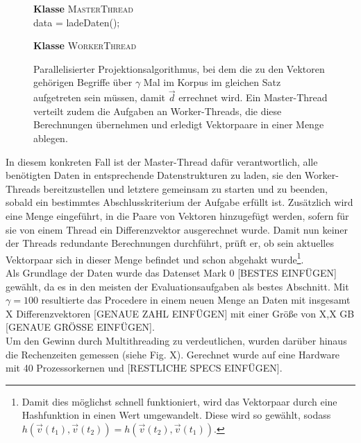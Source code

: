 \begin{figure}[h]
  \centering
  \begin{algorithm}[H]
    \BlankLine
    \textbf{Klasse} \textsc{MasterThread} \\
      data = ladeDaten();\\

    \BlankLine
    \textbf{Klasse} \textsc{WorkerThread} \\
  \end{algorithm}
  \caption[Parallelisierter Projektionsalgorithmus]{Parallelisierter Projektionsalgorithmus, bei dem die zu den Vektoren gehörigen
  Begriffe über $\gamma$ Mal im Korpus im gleichen Satz aufgetreten sein müssen, damit $\vec{d}$ errechnet wird. Ein Master-Thread
  verteilt zudem die Aufgaben an Worker-Threads, die diese Berechnungen übernehmen und erledigt Vektorpaare in einer Menge ablegen.}
\end{figure}

In diesem konkreten Fall ist der Master-Thread dafür verantwortlich, alle benötigten Daten in entsprechende Datenstrukturen
zu laden, sie den Worker-Threads bereitzustellen und letztere gemeinsam zu starten und zu beenden, sobald ein bestimmtes
Abschlusskriterium der Aufgabe erfüllt ist.
Zusätzlich wird eine Menge eingeführt, in die Paare von Vektoren hinzugefügt werden, sofern für sie von einem Thread
ein Differenzvektor ausgerechnet wurde. Damit nun keiner der Threads redundante Berechnungen durchführt, prüft er, ob sein
aktuelles Vektorpaar sich in dieser Menge befindet und schon abgehakt wurde\footnote{Damit dies möglichst schnell funktioniert,
wird das Vektorpaar durch eine Hashfunktion in einen Wert umgewandelt. Diese wird so gewählt,
sodass $h(\vec{v}(t_1), \vec{v}(t_2)) = h(\vec{v}(t_2), \vec{v}(t_1))$.}.\\

Als Grundlage der Daten wurde das Datenset Mark 0 [BESTES EINFÜGEN] gewählt, da es in den meisten der Evaluationsaufgaben
als bestes Abschnitt. Mit $\gamma = 100$ resultierte das Procedere in einem neuen Menge an Daten mit insgesamt
X Differenzvektoren [GENAUE ZAHL EINFÜGEN] mit einer Größe von X,X GB [GENAUE GRÖSSE EINFÜGEN].\\
Um den Gewinn durch Multithreading zu verdeutlichen, wurden darüber hinaus die Rechenzeiten gemessen (siehe Fig. X).
Gerechnet wurde auf eine Hardware mit 40 Prozessorkernen und [RESTLICHE SPECS EINFÜGEN].

